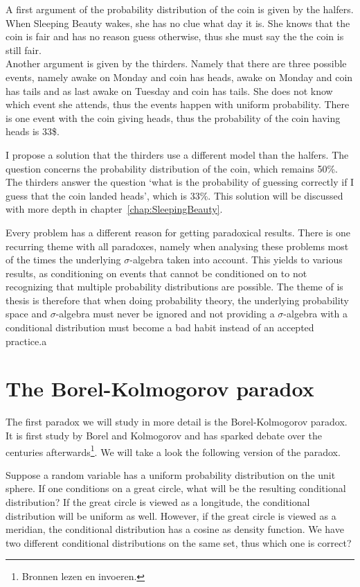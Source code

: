 \documentclass[twoside,a4paper]{report}
\theoremstyle{plain}
\theoremstyle{definition}
\theoremstyle{remark}
\numberwithin{equation}{chapter}
\DeclareMathOperator{\1}{\mathbbm{1}}
\begin{document}
A first argument of the probability distribution of the coin is given by the halfers. When Sleeping Beauty wakes, she has no clue what day it is. She knows that the coin is fair and has no reason guess otherwise, thus she must say the the coin is still fair.\\
Another argument is given by the thirders. Namely that there are three possible events, namely awake on Monday and coin has heads, awake on Monday and coin has tails and as last awake on Tuesday and coin has tails. She does not know which event she attends, thus the events happen with uniform probability. There is one event with the coin giving heads, thus the probability of the coin having heads is 33\$.

I propose a solution that the thirders use a different model than the halfers. The question concerns the probability distribution of the coin, which remains 50\%. The thirders answer the question `what is the probability of guessing correctly if I guess that the coin landed heads', which is 33\%. This solution will be discussed with more depth in chapter~\ref{chap:SleepingBeauty}.

Every problem has a different reason for getting paradoxical results. There is one recurring theme with all paradoxes, namely when analysing these problems most of the times the underlying $\sigma$-algebra taken into account. This yields to various results, as conditioning on events that cannot be conditioned on to not recognizing that multiple probability distributions are possible. The theme of is thesis is therefore that when doing probability theory, the underlying probability space and $\sigma$-algebra must never be ignored and not providing a $\sigma$-algebra with a conditional distribution must become a bad habit instead of an accepted practice.a

\chapter{The Borel-Kolmogorov paradox}\label{chap:BorelKolmogorov}
The first paradox we will study in more detail is the Borel-Kolmogorov paradox. It is first study by Borel \cite{Borel09} and Kolmogorov \cite{Kolmogorov33} and has sparked debate over the centuries afterwards\footnote{Bronnen lezen en invoeren.}. We will take a look the following version of the paradox.

Suppose a random variable has a uniform probability distribution on the unit sphere. If one conditions on a great circle, what will be the resulting conditional distribution? If the great circle is viewed as a longitude, the conditional distribution will be uniform as well. However, if the great circle is viewed as a meridian, the conditional distribution has a cosine as density function. We have two different conditional distributions on the same set, thus which one is correct?
\end{document}

